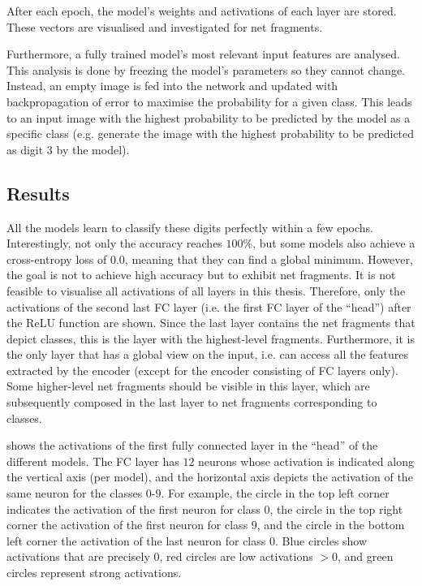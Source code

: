 After each epoch, the model's weights and activations of each layer are stored.
These vectors are visualised and investigated for net fragments.

Furthermore, a fully trained model's most relevant input features are analysed.
This analysis is done by freezing the model's parameters so they cannot change.
Instead, an empty image is fed into the network and updated with backpropagation of error to maximise the probability for a given class.
This leads to an input image with the highest probability to be predicted by the model as a specific class (e.g. generate the image with the highest probability to be predicted as digit $3$ by the model).


\subsection{Results}
All the models learn to classify these digits perfectly within a few epochs.
Interestingly, not only the accuracy reaches $100\%$, but some models also achieve a cross-entropy loss of $0.0$, meaning that they can find a global minimum.
However, the goal is not to achieve high accuracy but to exhibit net fragments.
It is not feasible to visualise all activations of all layers in this thesis.
Therefore, only the activations of the second last FC layer (i.e. the first FC layer of the ``head'') after the ReLU function are shown.
Since the last layer contains the net fragments that depict classes, this is the layer with the highest-level fragments.
Furthermore, it is the only layer that has a global view on the input, i.e. can access all the features extracted by the encoder (except for the encoder consisting of FC layers only).
Some higher-level net fragments should be visible in this layer, which are subsequently composed in the last layer to net fragments corresponding to classes.

 shows the activations of the first fully connected layer in the ``head'' of the different models.
The FC layer has $12$ neurons whose activation is indicated along the vertical axis (per model), and the horizontal axis depicts the activation of the same neuron for the classes $0$-$9$.
For example, the circle in the top left corner indicates the activation of the first neuron for class $0$, the circle in the top right corner the activation of the first neuron for class $9$, and the circle in the bottom left corner the activation of the last neuron for class $0$.
Blue circles show activations that are precisely $0$, red circles are low activations $>0$, and green circles represent strong activations.

